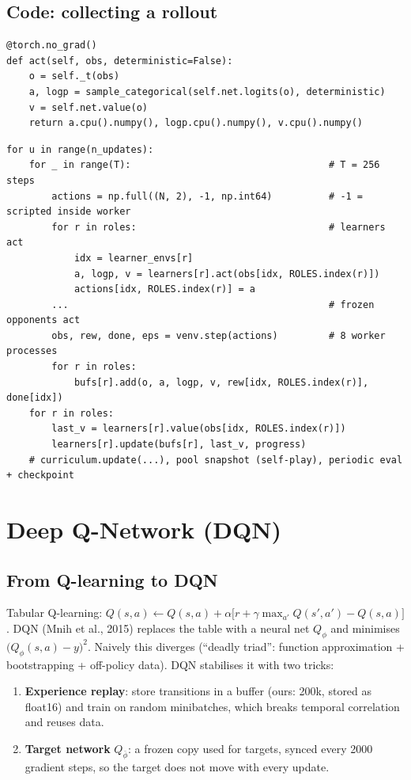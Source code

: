 \documentclass[11pt,a4paper]{article}
\newcommand{\code}[1]{\texttt{#1}}
\begin{document}
\subsection{Code: collecting a rollout}
\begin{lstlisting}[title={\code{rl/ppo.py} -- PPO.act (exact)}]
@torch.no_grad()
def act(self, obs, deterministic=False):
    o = self._t(obs)
    a, logp = sample_categorical(self.net.logits(o), deterministic)
    v = self.net.value(o)
    return a.cpu().numpy(), logp.cpu().numpy(), v.cpu().numpy()
\end{lstlisting}
\begin{lstlisting}[title={\code{training/train.py} -- training loop skeleton (abridged)}]
for u in range(n_updates):
    for _ in range(T):                                   # T = 256 steps
        actions = np.full((N, 2), -1, np.int64)          # -1 = scripted inside worker
        for r in roles:                                  # learners act
            idx = learner_envs[r]
            a, logp, v = learners[r].act(obs[idx, ROLES.index(r)])
            actions[idx, ROLES.index(r)] = a
        ...                                              # frozen opponents act
        obs, rew, done, eps = venv.step(actions)         # 8 worker processes
        for r in roles:
            bufs[r].add(o, a, logp, v, rew[idx, ROLES.index(r)], done[idx])
    for r in roles:
        last_v = learners[r].value(obs[idx, ROLES.index(r)])
        learners[r].update(bufs[r], last_v, progress)
    # curriculum.update(...), pool snapshot (self-play), periodic eval + checkpoint
\end{lstlisting}

\section{Deep Q-Network (DQN)}

\subsection{From Q-learning to DQN}
Tabular Q-learning: $Q(s,a)\leftarrow Q(s,a)+\alpha\big[r+\gamma\max_{a'}Q(s',a')-Q(s,a)\big]$.
DQN (Mnih et al., 2015) replaces the table with a neural net $Q_\phi$ and minimises
$\big(Q_\phi(s,a)-y\big)^2$. Naively this diverges (``deadly triad'': function approximation +
bootstrapping + off-policy data). DQN stabilises it with two tricks:
\begin{enumerate}
  \item \textbf{Experience replay}: store transitions in a buffer (ours: 200k, stored as float16) and
        train on random minibatches, which breaks temporal correlation and reuses data.
  \item \textbf{Target network} $Q_{\bar\phi}$: a frozen copy used for targets, synced every
        2000 gradient steps, so the target does not move with every update.
\end{enumerate}
\end{document}

